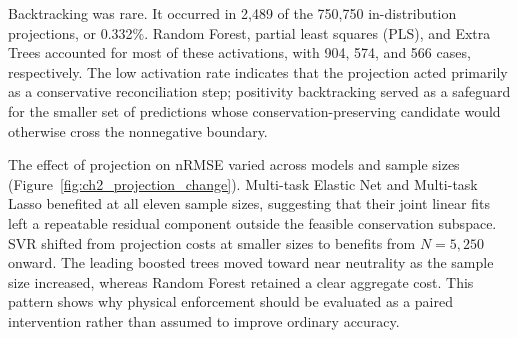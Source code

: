 \documentclass[12pt, twoside]{book}
\begin{document}
\begin{table}[htbp]
\centering
\caption{Physical-admissibility diagnostics at \(N=10,000\). Raw rates and displacement are five-fold means. Projected mass-conservation and nonnegativity violation rates were zero for every surrogate.}
\label{tab:ch2_projection_physics}
\scriptsize
\setlength{\tabcolsep}{4pt}
\end{table}

Backtracking was rare. It occurred in 2,489 of the 750,750 in-distribution projections, or 0.332\%. Random
Forest, partial least squares (PLS), and Extra Trees accounted for most of these activations, with 904, 574,
and 566 cases, respectively. The low activation rate indicates that the projection acted primarily as a
conservative reconciliation step; positivity backtracking served as a safeguard for the smaller set of
predictions whose conservation-preserving candidate would otherwise cross the nonnegative boundary.

The effect of projection on nRMSE varied across models and sample sizes (Figure~\ref{fig:ch2_projection_change}).
Multi-task Elastic Net and Multi-task Lasso benefited at all eleven sample sizes, suggesting that their joint
linear fits left a repeatable residual component outside the feasible conservation subspace. SVR shifted from
projection costs at smaller sizes to benefits from \(N=5,250\) onward. The leading boosted trees moved toward
near neutrality as the sample size increased, whereas Random Forest retained a clear aggregate cost. This
pattern shows why physical enforcement should be evaluated as a paired intervention rather than assumed to
improve ordinary accuracy.
\end{document}
